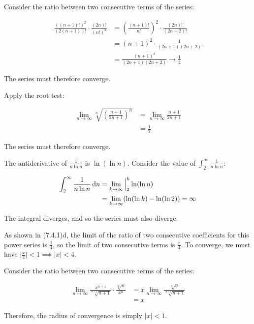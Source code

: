 
Consider the ratio between two consecutive terms of the series:

\begin{align*}
  \frac{((n + 1)!)^2}{(2(n + 1))!} \cdot \frac{(2n)!}{(n!)^2} &= \left(\frac{(n + 1)!}{n!}\right)^2 \cdot \frac{(2n)!}{(2n + 2)!} \\
  &= (n + 1)^2 \cdot \frac{1}{(2n + 1)(2n + 2)} \\
  &= \frac{(n + 1)^2}{(2n + 1)(2n + 2)} \rightarrow \frac{1}{4}
\end{align*}

The series must therefore converge.

Apply the root test:

\begin{align*}
  \lim_{n \rightarrow \infty} \sqrt[n]{\left(\frac{n + 1}{2n + 1}\right)^n} &= \lim_{n \rightarrow \infty} \frac{n + 1}{2n + 1} \\
  &= \frac{1}{2}
\end{align*}

The series must therefore converge.

The antiderivative of $\frac{1}{n \ln n}$ is $\ln(\ln n)$. Consider the value of $\int_2^{\infty} \frac{1}{n \ln n}$:

\begin{align*}
  \int_2^{\infty} \frac{1}{n \ln n} \mathop{}\!\mathrm{d} n &= \lim_{k \rightarrow \infty} \Big|_2^{k} \ln(\ln n) \\
  &= \lim_{k \rightarrow \infty} (\ln(\ln k) - \ln(\ln 2)) = \infty
\end{align*}

The integral diverges, and so the series must also diverge.


As shown in (7.4.1)d, the limit of the ratio of two consecutive coefficients for this power series is $\frac{1}{4}$, so the limit of two consecutive terms is $\frac{x}{4}$. To converge, we must have $\Big|\frac{x}{4}\Big| < 1 \implies |x| < 4$.

Consider the ratio between two consecutive terms of the series:

\begin{align*}
  \lim_{n \rightarrow \infty} \frac{x^{n + 1}}{\sqrt[n + 1]{n + 1}} \cdot \frac{\sqrt[n]{n}}{x^n} &= x \lim_{n \rightarrow \infty} \frac{\sqrt[n]{n}}{\sqrt[n + 1]{n + 1}} \\
  &= x
\end{align*}

Therefore, the radius of convergence is simply $|x| < 1$.




